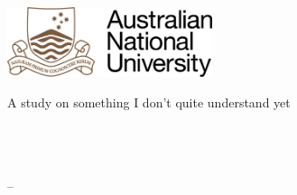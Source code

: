 
\begin{titlepage}

\begin{addmargin}[-1cm]{-3cm}
\begin{center}
\large

\hfill
\vfill

\begingroup
\color{Maroon} \\ \bigskip %
\endgroup


\vfill

\includegraphics[width=6cm]{Figures/ANU_Logo} \\ \bigskip %

A study on something I don't quite understand yet \\ \bigskip \bigskip %
\myDegree \\
\myDepartment \\
\myUni \\ 
\bigskip \bigskip

\myTime -- \myVersion %

\vfill

\end{center}
\end{addmargin}

\end{titlepage}